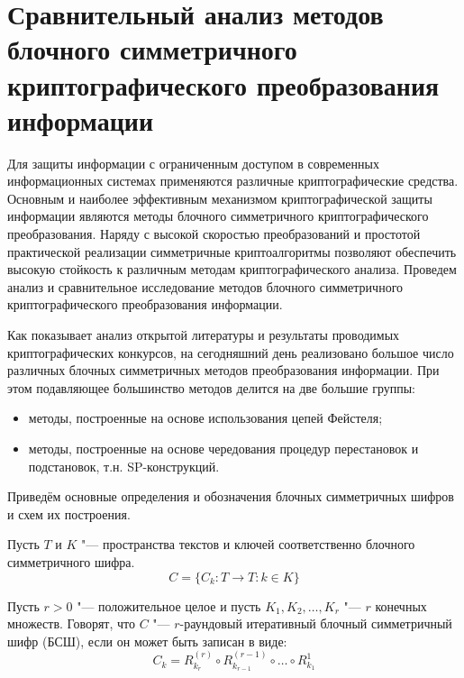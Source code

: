 \section{Сравнительный анализ методов блочного симметричного криптографического
преобразования информации}

Для защиты информации с ограниченным доступом в современных информационных
системах применяются различные криптографические средства. Основным и наиболее
эффективным механизмом криптографической защиты информации являются методы
блочного симметричного криптографического преобразования. Наряду с высокой
скоростью преобразований и  простотой практической реализации симметричные
криптоалгоритмы позволяют обеспечить высокую стойкость к различным методам
криптографического анализа. Проведем анализ и сравнительное исследование методов
блочного симметричного  криптографического преобразования информации.

Как показывает анализ открытой литературы и результаты проводимых
криптографических конкурсов, на сегодняшний день реализовано большое число
различных блочных симметричных методов преобразования информации. При этом
подавляющее большинство методов делится на две большие группы: 

\begin{itemize}

    \item методы, построенные на основе использования цепей Фейстеля;

    \item методы, построенные на основе чередования процедур перестановок и
    подстановок, т.н. SP-конструкций. 

\end{itemize}

Приведём основные определения и обозначения блочных симметричных шифров и схем
их построения.

Пусть $T$ и $K$ "--- пространства текстов и ключей соответственно блочного
симметричного шифра.
\begin{equation}C = \{C_k: T \rightarrow T: k \in K\}\end{equation}

Пусть $r > 0$ "--- положительное целое и пусть $K_1, K_2, \ldots, K_r$ "--- $r$
конечных множеств. Говорят, что $C$ "--- $r$-раундовый итеративный блочный
симметричный шифр (БСШ), если он может быть записан в виде:
\begin{equation}C_k = R^{(r)}_{k_r} \circ R^{(r-1)}_{k_{r-1}} \circ \ldots \circ
R^{1}_{k_1}\end{equation}

